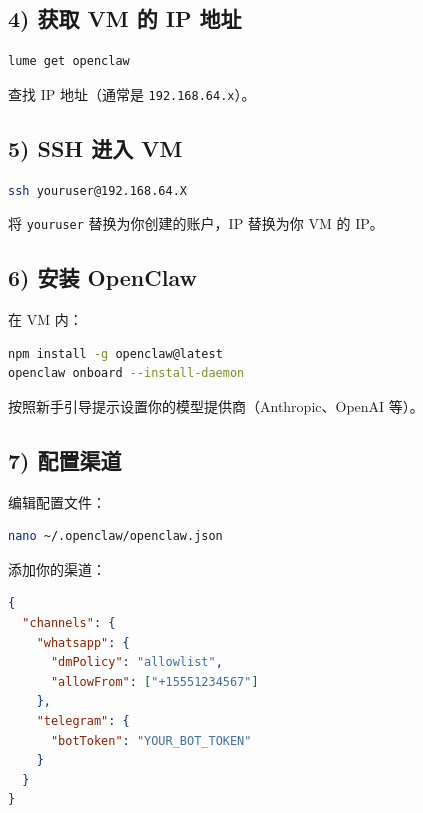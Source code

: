 \hrulefill


\subsection{4) 获取 VM 的 IP 地址}


\begin{lstlisting}[language=bash]
lume get openclaw
\end{lstlisting}


查找 IP 地址（通常是 \texttt{192.168.64.x}）。

\hrulefill


\subsection{5) SSH 进入 VM}


\begin{lstlisting}[language=bash]
ssh youruser@192.168.64.X
\end{lstlisting}


将 \texttt{youruser} 替换为你创建的账户，IP 替换为你 VM 的 IP。

\hrulefill


\subsection{6) 安装 OpenClaw}


在 VM 内：

\begin{lstlisting}[language=bash]
npm install -g openclaw@latest
openclaw onboard --install-daemon
\end{lstlisting}


按照新手引导提示设置你的模型提供商（Anthropic、OpenAI 等）。

\hrulefill


\subsection{7) 配置渠道}


编辑配置文件：

\begin{lstlisting}[language=bash]
nano ~/.openclaw/openclaw.json
\end{lstlisting}


添加你的渠道：

\begin{lstlisting}[language=json]
{
  "channels": {
    "whatsapp": {
      "dmPolicy": "allowlist",
      "allowFrom": ["+15551234567"]
    },
    "telegram": {
      "botToken": "YOUR_BOT_TOKEN"
    }
  }
}
\end{lstlisting}


